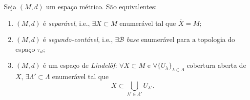 \begin{prop}
    Seja $\left( M, d \right) $ um espaço métrico. São equivalentes:
    \begin{enumerate}
        \item $\left( M, d \right) $ é \emph{separável}, i.e., $\exists  X\subset M$ enumerável tal que $\overline{X}=M$;
	\item $\left( M, d \right) $ é \emph{segundo-contável}, i.e., $\exists \mathcal{B}$ \emph{base} enumerável para a topologia do espaço $\tau_d$;
	\item $\left( M, d \right) $ é um espaço de \emph{Lindelöf}:  $\forall X\subset M$ e $\forall \{U_\lambda\}_{\lambda \in \Lambda}$ cobertura aberta de $X$, $\exists \Lambda ' \subset \Lambda$ enumerável tal que \[
	X \subset \bigcup_{\lambda'\in \Lambda'} U_{\lambda'}
	.\] 
    \end{enumerate}
\end{prop}
